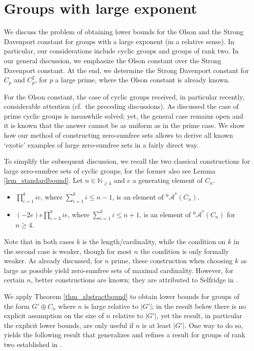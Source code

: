 \documentclass{amsart}
\theoremstyle{definition}
\numberwithin{equation}{section}
\begin{document}
\section{Groups with large exponent}
\label{sec_large}

We discuss the problem of obtaining lower bounds for the Olson and the Strong Davenport constant
for groups with a large exponent (in a relative sense).
In particular, our considerations include cyclic groups and groups of rank two.
In our general discussion, we emphasize the Olson constant over the Strong Davenport constant. At the end, we determine the Strong Davenport constant for
$C_p$ and $C_p^2$, for $p$ a large prime, where the Olson constant is already known.

For the Olson constant, the case of cyclic groups received, in particular recently, considerable attention (cf.~the preceding discussions).
As discussed the case of prime cyclic groups is meanwhile solved;
yet, the general case remains open and it is known that the answer cannot be as uniform
as in the prime case. We show how our method of constructing zero-sumfree sets allows
to derive all known `exotic' examples of large zero-sumfree sets in a fairly direct way.

To simplify the subsequent discussion, we recall the two classical constructions for large zero-sumfree sets of cyclic groups; for the former also see Lemma \ref{lem_standardbound}.
Let $n\in \mathbb{N}_{\ge 4}$ and $e$ a generating element of $C_n$.
\begin{itemize}
  \item $\prod_{i=1}^k ie$, where $\sum_{i=1}^k i \le n-1$, is an element of ${{}^{{0}}\!\mathcal{A}^{\ast}}(C_n)$.
  \item $(-2e)e\prod_{i=3}^k ie$, where $\sum_{i=1}^k i \le n+1$, is an element of ${{}^{{0}}\!\mathcal{A}^{\ast}}(C_n)$ for $n \ge 4$.
\end{itemize}
Note that in both cases $k$ is the length/cardinality, while the condition on $k$ in the second case is weaker,
though for most $n$ the condition is only formally weaker.
As already discussed, for $n$ prime, these construction when choosing $k$ as large as possible yield zero-sumfree sets of maximal cardinality. However, for certain $n$, better constructions are known; they are attributed to
Selfridge in \cite[C15]{guy}.

We apply Theorem \ref{thm_abstractbound} to obtain lower bounds for groups of the form $G' \oplus C_n$ where $n$ is large relative to $|G'|$; in the result below there is no explicit assumption on the size of $n$ relative to $|G'|$, yet the result, in particular the explicit lower bounds, are only useful if $n$ is at least $|G'|$.
One way to do so, yields the following result that generalizes and refines a result for groups of rank two established in \cite[Theorem 9]{chabela}.
\end{document}
